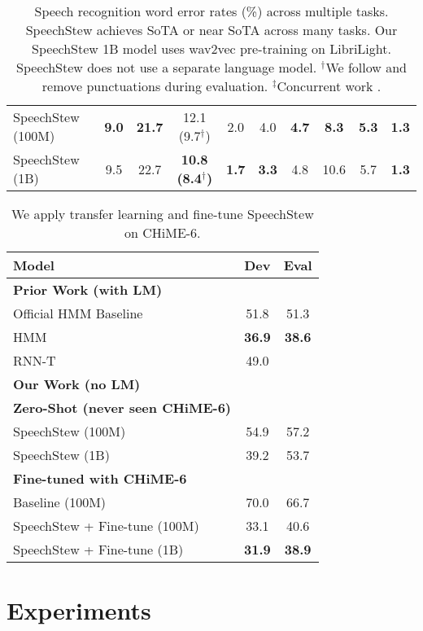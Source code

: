 \documentclass[a4paper]{article}
\begin{document}
\begin{table*}[t]
{\begin{tabular}{lccccccccc}
\quad SpeechStew (100M) & \textbf{9.0} & \textbf{21.7} & 12.1 (9.7$^\dagger$) & 2.0 & 4.0 & \textbf{4.7} & \textbf{8.3} & \textbf{5.3} & \textbf{1.3} \\
\quad SpeechStew (1B) & 9.5 & 22.7 & \textbf{10.8 (8.4$^\dagger$)} & \textbf{1.7} & \textbf{3.3} & 4.8 & 10.6 & 5.7 & \textbf{1.3} \\
\bottomrule
\end{tabular}}
\caption{Speech recognition word error rates (\%) across multiple tasks. SpeechStew achieves SoTA or near SoTA across many tasks. Our SpeechStew 1B model uses wav2vec pre-training on LibriLight. SpeechStew does not use a separate language model. $^\dagger$We follow \cite{likhomanenko-arxiv-2020} and remove punctuations during evaluation. $^\ddagger$Concurrent work \cite{kanda-arxiv-2021}.}
\label{table:results}
\end{table*}

\begin{table}[t]
\centering
\begin{tabular}{lcc}
\toprule
\bfseries Model & \bfseries Dev & \bfseries Eval \\
\midrule
\textbf{Prior Work (with LM)} \\
\quad Official HMM Baseline \cite{watanabe-arxiv-2020} & 51.8 & 51.3 \\
\quad HMM \cite{medennikov-chime-2020} & \textbf{36.9} & \textbf{38.6} \\
\quad RNN-T \cite{andrusenko-arxiv-2020} & 49.0 \\
\midrule
\textbf{Our Work (no LM)} \\
\quad\textbf{Zero-Shot (never seen CHiME-6)} \\
\quad\quad SpeechStew (100M) & 54.9 & 57.2 \\
\quad\quad SpeechStew (1B) & 39.2 & 53.7 \\
\quad\textbf{Fine-tuned with CHiME-6} \\
\quad\quad Baseline (100M) & 70.0 & 66.7 \\
\quad\quad SpeechStew + Fine-tune (100M) & 33.1 & 40.6 \\
\quad\quad SpeechStew + Fine-tune (1B) & \textbf{31.9} & \textbf{38.9} \\
\bottomrule
\end{tabular}
\caption{We apply transfer learning and fine-tune SpeechStew on CHiME-6.}
\label{tab:chime}
\end{table}

\section{Experiments}
\end{document}
